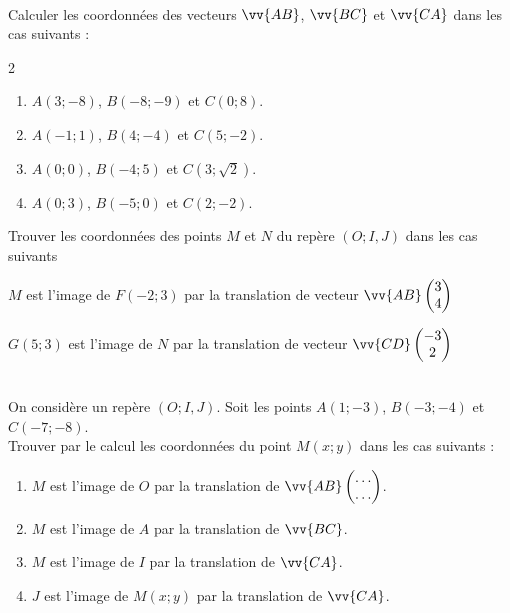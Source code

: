 \begin{exercise}\label{chapter06:exercice:vecteurscoordonnees}\hfill \\ 
	Calculer les coordonnées des vecteurs $\vv{AB}$, $\vv{BC}$ et $\vv{CA}$  dans les cas suivants :
	\begin{multicols}{2}
		\begin{enumerate}[leftmargin=*,label=\alph*)]
			\item $A(3;-8)$, $B(-8;-9)$ et $C(0;8)$.
			\item $A(-1;1)$, $B(4;-4)$ et $C(5;-2)$.
			\item $A(0;0)$, $B(-4;5)$ et $C(3;\sqrt{2})$.
			\item $A(0;3)$, $B(-5;0)$ et $C(2;-2)$.
		\end{enumerate}
	\end{multicols}
\end{exercise}
\begin{example}Trouver les coordonnées des points $M$ et $N$ du repère $(O;I,J)$ dans les cas suivants\hfill \smallskip
	
	\noindent\parbox{0.47\linewidth}{
		$M$ est l'image de $F(-2;3)$ par la translation de vecteur $\vv{AB}\begin{pmatrix}
			3\\4
		\end{pmatrix}$
	}
	\hfill 
	\parbox{0.47\linewidth}{
		$G(5;3)$ est l'image de $N$ par la translation de vecteur $\vv{CD}\begin{pmatrix}
			-3\\2
		\end{pmatrix}$
	}	
	
	\vfill 
	
\end{example}

\begin{exercise}\label{chapter06:exercice:translationcoordonnees}\hfill \\
	On considère un repère $(O;I,J)$. Soit les points $A(1;-3)$, $B(-3;-4)$ et $C(-7;-8)$. \\
	Trouver par le calcul les coordonnées du point $M(x;y)$ dans les cas suivants : 
	\begin{enumerate}[leftmargin=*,label=\alph*)] 
		\item $M$ est l'image de $O$ par la translation de $\vv{AB}\begin{pmatrix}
			\ldots \\ \ldots
		\end{pmatrix}$. 
		\item $M$ est l'image de $A$ par la translation de $\vv{BC}$.
		\item $M$ est l'image de $I$ par la translation de $\vv{CA}$.
		\item $J$ est l'image de $M(x;y)$ par la translation de $\vv{CA}$.
	\end{enumerate} 
\end{exercise} 

